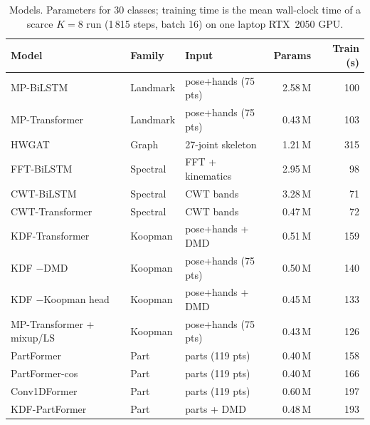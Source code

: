 \begin{table}[t]
\centering
\small
\caption{Models. Parameters for 30 classes; training time is the mean wall-clock time of a scarce $K{=}8$ run (1\,815 steps, batch 16) on one laptop RTX~2050 GPU.}
\label{tab:models}
\begin{tabular}{lllrr}
\toprule
Model & Family & Input & Params & Train (s) \\
\midrule
MP-BiLSTM & Landmark & pose+hands (75 pts) & 2.58\,M & 100 \\
MP-Transformer & Landmark & pose+hands (75 pts) & 0.43\,M & 103 \\
\midrule
HWGAT & Graph & 27-joint skeleton & 1.21\,M & 315 \\
\midrule
FFT-BiLSTM & Spectral & FFT + kinematics & 2.95\,M & 98 \\
CWT-BiLSTM & Spectral & CWT bands & 3.28\,M & 71 \\
CWT-Transformer & Spectral & CWT bands & 0.47\,M & 72 \\
\midrule
KDF-Transformer & Koopman & pose+hands + DMD & 0.51\,M & 159 \\
KDF $-$DMD & Koopman & pose+hands (75 pts) & 0.50\,M & 140 \\
KDF $-$Koopman head & Koopman & pose+hands + DMD & 0.45\,M & 133 \\
MP-Transformer + mixup/LS & Koopman & pose+hands (75 pts) & 0.43\,M & 126 \\
\midrule
PartFormer & Part & parts (119 pts) & 0.40\,M & 158 \\
PartFormer-cos & Part & parts (119 pts) & 0.40\,M & 166 \\
Conv1DFormer & Part & parts (119 pts) & 0.60\,M & 197 \\
KDF-PartFormer & Part & parts + DMD & 0.48\,M & 193 \\
\bottomrule
\end{tabular}
\end{table}
